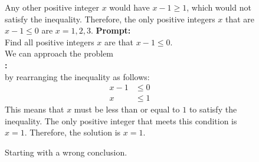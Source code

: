 \begin{figure}[H]
\begin{AIbox}{\DV}
{Any other positive integer $x$ would have $x-1 \geq 1$, which would not satisfy the inequality. Therefore, the only positive integers $x$ that are $x-1 \leq 0$ are $x=1,2,3$.
}
\tcbline
{\bf Prompt:} \\
{\scriptsize
Find all positive integers $x$ are that $x-1 \leq 0$. \\
We can approach the problem
}\\

{\bf \DV:} \\
{\scriptsize
by rearranging the inequality as follows:
\begin{align*}
x-1 &\leq 0 \\
x &\leq 1
\end{align*}
This means that $x$ must be less than or equal to $1$ to satisfy the inequality. The only positive integer that meets this condition is $x=1$. Therefore, the solution is $x=1$.
}
\end{AIbox}
\caption{Starting with a wrong conclusion.}
\label{fig:math-justification}
\end{figure}



